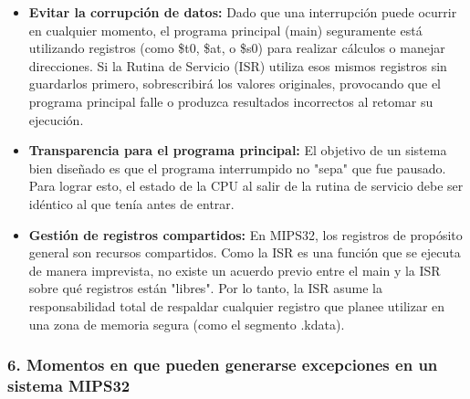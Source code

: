 \documentclass[12pt,a4paper]{article}
\begin{document}
\begin{itemize}
    \item \textbf{Evitar la corrupción de datos:} Dado que una interrupción puede ocurrir en cualquier momento, el programa principal (main) seguramente está utilizando registros (como \$t0, \$at, o \$s0) para realizar cálculos o manejar direcciones. Si la Rutina de Servicio (ISR) utiliza esos mismos registros sin guardarlos primero, sobrescribirá los valores originales, provocando que el programa principal falle o produzca resultados incorrectos al retomar su ejecución.
    \item \textbf{Transparencia para el programa principal:} El objetivo de un sistema bien diseñado es que el programa interrumpido no "sepa" que fue pausado. Para lograr esto, el estado de la CPU al salir de la rutina de servicio debe ser idéntico al que tenía antes de entrar.
    \item \textbf{Gestión de registros compartidos:} En MIPS32, los registros de propósito general son recursos compartidos. Como la ISR es una función que se ejecuta de manera imprevista, no existe un acuerdo previo entre el main y la ISR sobre qué registros están "libres". Por lo tanto, la ISR asume la responsabilidad total de respaldar cualquier registro que planee utilizar en una zona de memoria segura (como el segmento .kdata).
\end{itemize}

\subsubsection{6. Momentos en que pueden generarse excepciones en un sistema MIPS32}
\end{document}
